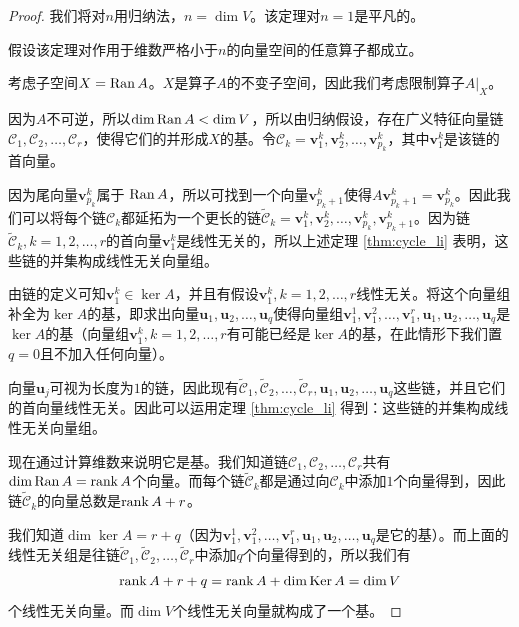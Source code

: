 \begin{proof}
    我们将对$n$用归纳法，$n=\dim V$。该定理对$n=1$是平凡的。

    假设该定理对作用于维数严格小于$n$的向量空间的任意算子都成立。

    考虑子空间$X=\operatorname{Ran} A$。$X$是算子$A$的不变子空间，因此我们考虑限制算子$A|_X$。

    因为$A$不可逆，所以$\dim \operatorname{Ran} A<\dim V$，所以由归纳假设，存在广义特征向量链${\mathcal{C}}_{1},{\mathcal{C}}_{2},\ldots,{\mathcal{C}}_{r}$，使得它们的并形成$X$的基。令${\mathcal{C}}_{k}=\mathbf{v}_{1}^{k},\mathbf{v}_{2}^{k},\ldots,\mathbf{v}_{p_{k}}^{k}$，其中$\mathbf{v}_{1}^{k}$是该链的首向量。

    因为尾向量$\mathbf{v}_{p_{k}}^k$属于 $\operatorname{Ran} A$，所以可找到一个向量$\mathbf{v}_{p_{k}+1}^k$使得\linebreak $A\mathbf{v}_{p_{k}+1}^k=\mathbf{v}_{p_{k}}^k$。因此我们可以将每个链${\mathcal{C}}_{k}$都延拓为一个更长的链\linebreak $\widetilde{\mathcal{C}}_{k}=\mathbf{v}_{1}^{k},\mathbf{v}_{2}^{k},\ldots,\mathbf{v}_{p_{k}}^{k},\mathbf{v}_{p_{k}+1}^{k}$。因为链$\widetilde{\mathcal{C}}_{k},k=1,2,\dots,r$的首向量$\mathbf{v}_1^k$是线性无关的，所以上述定理 \ref{thm:cycle_li} 表明，这些链的并集构成线性无关向量组。

    由链的定义可知$\mathbf{v}_1^k\in\ker A$，并且有假设$\mathbf{v}_1^k,k=1,2,\dots,r$线性无关。将这个向量组补全为$\ker A$的基，即求出向量$\mathbf{u}_{1},\mathbf{u}_{2},\ldots,\mathbf{u}_{q}$使得向量组$\mathbf{v}_{1}^{1},\mathbf{v}_{1}^{2},\ldots,\mathbf{v}_{1}^{r},\mathbf{u}_{1},\mathbf{u}_{2},\ldots,\mathbf{u}_{q}$是$\ker A$的基（向量组$\mathbf{v}_1^k,k=1,2,\dots,r$有可能已经是$\ker A$的基，在此情形下我们置$q=0$且不加入任何向量）。

    向量$\mathbf{u}_j$可视为长度为$1$的链，因此现有$\widetilde{\mathcal{C}}_{1},\widetilde{\mathcal{C}}_{2},\ldots,\widetilde{\mathcal{C}}_{r},\mathbf{u}_{1},\mathbf{u}_{2},\ldots,\mathbf{u}_{q}$这些链，并且它们的首向量线性无关。因此可以运用定理 \ref{thm:cycle_li} 得到：这些链的并集构成线性无关向量组。

    现在通过计算维数来说明它是基。我们知道链${\mathcal{C}}_{1},{\mathcal{C}}_{2},\ldots,{\mathcal{C}}_{r}$共有$\dim\operatorname{Ran} A=\operatorname{rank} A$个向量。而每个链$\widetilde{\mathcal{C}}_{k}$都是通过向$\mathcal{C}_{k}$中添加$1$个向量得到，因此链$\widetilde{\mathcal{C}}_{k}$的向量总数是$\operatorname{rank} A+r$。

    我们知道$\dim \ker A=r+q$（因为$\mathbf{v}_{1}^{1},\mathbf{v}_{1}^{2},\ldots,\mathbf{v}_{1}^{r},\mathbf{u}_{1},\mathbf{u}_{2},\ldots,\mathbf{u}_{q}$是它的基）。而上面的线性无关组是往链$\widetilde{\mathcal{C}}_{1},\widetilde{\mathcal{C}}_{2},\ldots,\widetilde{\mathcal{C}}_{r}$中添加$q$个向量得到的，所以我们有
    \[\operatorname{rank} A + r + q = \operatorname{rank} A+\dim\operatorname{Ker} A=\dim V\]
    个线性无关向量。而$\dim V$个线性无关向量就构成了一个基。
\end{proof}

